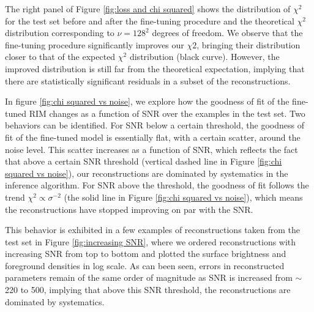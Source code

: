 The right panel of Figure \ref{fig:loss and chi squared} shows the distribution of  $\chi^2$ for the test set before and after the fine-tuning procedure and the theoretical $\chi^2$ distribution corresponding to $\nu=128^2$ degrees of freedom.
We observe that the fine-tuning procedure significantly improves our $\chi2$, bringing their distribution closer to that of the expected $\chi^2$ distribution (black curve). However, the improved distribution is still far from the theoretical expectation, implying that there are statistically significant residuals in a subset of the reconstructions.

In figure \ref{fig:chi squared vs noise}, we explore how the goodness of fit of the fine-tuned RIM changes as a function of SNR over the examples in the test set. Two behaviors can be identified. For SNR below a certain threshold, the goodness of fit 
of the fine-tuned model is essentially flat, with a certain scatter, around the noise level. This scatter increases as a function of SNR, which reflects the fact that above a certain SNR threshold (vertical dashed line in Figure \ref{fig:chi squared vs noise}), our reconstructions are dominated by systematics in the inference algorithm.
For SNR above the threshold, 
the goodness of fit follows the trend $\chi^2 \propto \sigma^{-2}$ (the solid line in Figure \ref{fig:chi squared vs noise}), which 
means the reconstructions have stopped improving on par with the SNR.

This behavior is exhibited in a few examples of reconstructions taken from the test set in Figure \ref{fig:increasing SNR}, where we ordered reconstructions with increasing SNR from top to bottom and plotted the surface brightness and foreground densities in log scale. As can been seen, errors in reconstructed parameters remain of the same order of magnitude as SNR is increased from $\sim$220 to 500, implying that above this SNR threshold, the reconstructions are dominated by systematics. 

